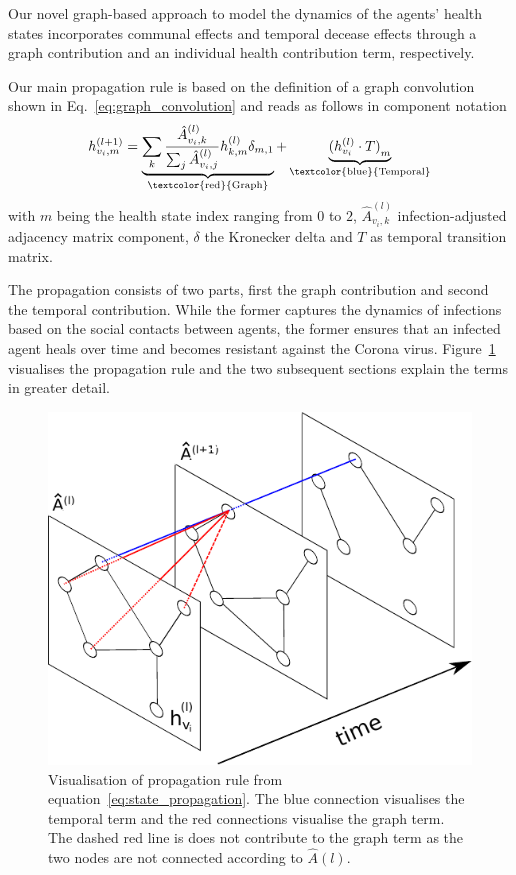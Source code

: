 Our novel graph-based approach to model the dynamics of the agents' health states incorporates communal effects and temporal decease effects through a graph contribution and an individual health contribution term, respectively.

Our main propagation rule is based on the definition of a graph convolution shown in Eq.~\eqref{eq:graph_convolution} and reads as follows in component notation
\begin{equation}
	\label{eq:state_propagation}
	h_{v_i, m}^{(l+1)}
	=
	\underbrace{
		\sum_k \frac{\hat{A}_{v_i, k}^{(l)}}{\sum_j \hat{A}_{v_i, j}^{(l)}} h_{k, m}^{(l)} \delta_{m, 1}
	}_{\text{\textcolor{red}{Graph}}}
	+
	\underbrace{
		{(h_{v_i}^{(l)}\cdot T)}_m
	}_{\text{\textcolor{blue}{Temporal}}}
\end{equation}
with $m$ being the health state index ranging from $0$ to $2$, $\hat{A}_{v_i, k}^{(l)}$ infection-adjusted adjacency matrix component, $\delta$ the Kronecker delta and $T$ as temporal transition matrix.

The propagation consists of two parts, first the graph contribution and second the temporal contribution. While the former captures the dynamics of infections based on the social contacts between agents, the former ensures that an infected agent heals over time and becomes resistant against the Corona virus. Figure~\ref{fig:state_propagation} visualises the propagation rule and the two subsequent sections explain the terms in greater detail.

\begin{figure}[H]
	\centering
	\includegraphics[width=0.8\columnwidth]{img/state_propagation.pdf}
	\caption{Visualisation of propagation rule from equation~\eqref{eq:state_propagation}. The blue connection visualises the temporal term and the red connections visualise the graph term. The dashed red line is does not contribute to the graph term as the two nodes are not connected according to $\hat{A}(l)$.}
	\label{fig:state_propagation}
\end{figure}

